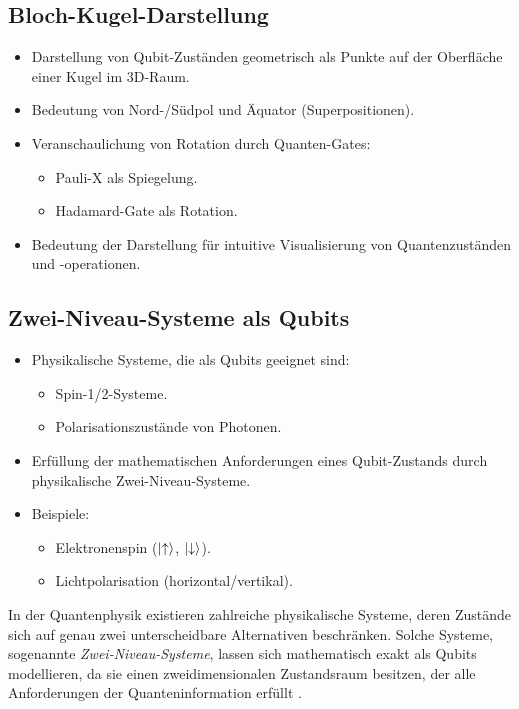 \subsection{Bloch-Kugel-Darstellung}
\begin{itemize}
    \item Darstellung von Qubit-Zuständen geometrisch als Punkte auf der Oberfläche einer Kugel im 3D-Raum.
    \item Bedeutung von Nord-/Südpol und Äquator (Superpositionen).
    \item Veranschaulichung von Rotation durch Quanten-Gates:
    \begin{itemize}
        \item Pauli-X als Spiegelung.
        \item Hadamard-Gate als Rotation.
    \end{itemize}
    \item Bedeutung der Darstellung für intuitive Visualisierung von Quantenzuständen und -operationen.
\end{itemize}

\subsection{Zwei-Niveau-Systeme als Qubits}
\begin{itemize}
    \item Physikalische Systeme, die als Qubits geeignet sind:
    \begin{itemize}
        \item Spin-1/2-Systeme.
        \item Polarisationszustände von Photonen.
    \end{itemize}
    \item Erfüllung der mathematischen Anforderungen eines Qubit-Zustands durch physikalische Zwei-Niveau-Systeme.
    \item Beispiele:
    \begin{itemize}
        \item Elektronenspin ($\ket{\uparrow}$, $\ket{\downarrow}$).
        \item Lichtpolarisation (horizontal/vertikal).
    \end{itemize}
\end{itemize}


In der Quantenphysik existieren zahlreiche physikalische Systeme, deren Zustände sich auf genau zwei unterscheidbare Alternativen beschränken. Solche Systeme, sogenannte \textit{Zwei-Niveau-Systeme}, lassen sich mathematisch exakt als Qubits modellieren, da sie einen zweidimensionalen Zustandsraum besitzen, der alle Anforderungen der Quanteninformation erfüllt \cite{nielsen2002quantum, sakurai1995modern}.


